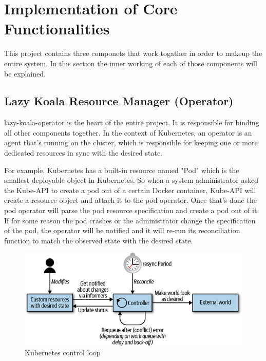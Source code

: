 \section{Implementation of Core Functionalities}

This project contains three componets that work togather in order to makeup the entire system. In this section the inner working of each of those components will be explained.

\subsection{Lazy Koala Resource Manager (Operator)}

\ac{lazy-koala-operator} is the heart of the entire project. It is responsible for binding all other components together. In the context of Kubernetes, an operator is an agent that's running on the cluster, which is responsible for keeping one or more dedicated resources in sync with the desired state. 

For example, Kubernetes has a built-in resource named "Pod" which is the smallest deployable object in Kubernetes. So when a system administrator asked the Kube-API to create a pod out of a certain Docker container, Kube-API will create a resource object and attach it to the pod operator. Once that's done the pod operator will parse the pod resource specification and create a pod out of it. If for some reason the pod crashes or the administrator change the specification of the pod, the operator will be notified and it will re-run its reconciliation function to match the observed state with the desired state.

\begin{figure}[H]
    \includegraphics[width=11.5cm]{assets/implementation/kubernetes-control-loop.png}
    \caption{Kubernetes control loop \citep{hausenblas2019programming}}
\end{figure}


